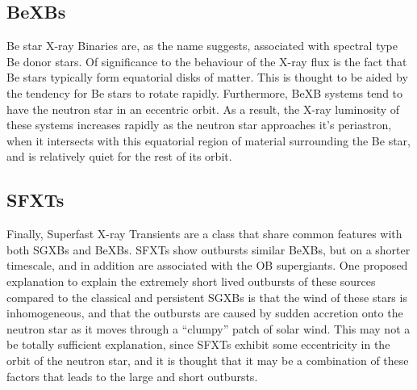 \subsection{BeXBs}
Be star X-ray Binaries are, as the name suggests, associated with spectral type Be donor stars. Of significance to the behaviour of the X-ray flux is the fact that Be stars typically form equatorial disks of matter. This is thought to be aided by the tendency for Be stars to rotate rapidly. Furthermore, BeXB systems tend to have the neutron star in an eccentric orbit. As a result, the X-ray luminosity of these systems increases rapidly as the neutron star approaches it\textquoteright{}s periastron, when it intersects with this equatorial region of material surrounding the Be star, and is relatively quiet for the rest of its orbit. 

\subsection{SFXTs}
Finally, Superfast X-ray Transients are a class that share common features with both SGXBs and BeXBs. SFXTs show outbursts similar BeXBs, but on a shorter timescale, and in addition are associated with the OB supergiants. One proposed explanation to explain the extremely short lived outbursts of these sources compared to the classical and persistent SGXBs is that the wind of these stars is inhomogeneous, and that the outbursts are caused by sudden accretion onto the neutron star as it moves through a \textquotedblleft{}clumpy\textquotedblright{} patch of solar wind. This may not a be totally sufficient explanation, since SFXTs exhibit some eccentricity in the orbit of the neutron star, and it is thought that it may be a combination of these factors that leads to the large and short outbursts. 